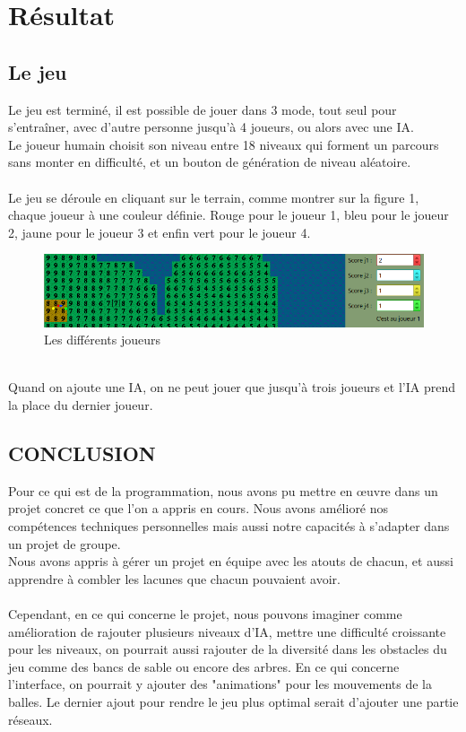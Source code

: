 \documentclass{article}
\begin{document}
\section{Résultat}
\subsection{Le jeu}
Le jeu est terminé, il est possible de jouer dans 3 mode, tout seul pour s'entraîner, avec d'autre personne jusqu'à 4 joueurs, ou alors avec une IA.\\
Le joueur humain choisit son niveau entre 18 niveaux qui forment un parcours sans monter en difficulté, et un bouton de génération de niveau aléatoire.\\~\\
Le jeu se déroule en cliquant sur le terrain, comme montrer sur la figure 1, chaque joueur à une couleur définie. Rouge pour le joueur 1, bleu pour le joueur 2, jaune pour le joueur 3 et enfin vert pour le joueur 4.
\begin{figure}[!h]
\centering
\includegraphics[scale=0.3]{Images/joueur.png}
\caption{Les différents joueurs}
\end{figure}
\\
Quand on ajoute une IA, on ne peut jouer que jusqu'à trois joueurs et l'IA prend la place du dernier joueur.
\subsection{CONCLUSION}
Pour ce qui est de la programmation, nous avons pu mettre en œuvre dans un projet concret ce que l'on a appris en cours. Nous avons amélioré nos compétences techniques personnelles mais aussi notre capacités à s'adapter dans un projet de groupe.\\
Nous avons appris à gérer un projet en équipe avec les atouts de chacun, et aussi apprendre à combler les lacunes que chacun pouvaient avoir.\\~\\
Cependant, en ce qui concerne le projet, nous pouvons imaginer comme amélioration de rajouter plusieurs niveaux d'IA, mettre une difficulté croissante pour les niveaux, on pourrait aussi rajouter de la diversité dans les obstacles du jeu comme des bancs de sable ou encore des arbres. En ce qui concerne l'interface, on pourrait y ajouter des "animations" pour les mouvements de la balles. Le dernier ajout pour rendre le jeu plus optimal serait d'ajouter une partie réseaux.
\newpage
\end{document}
